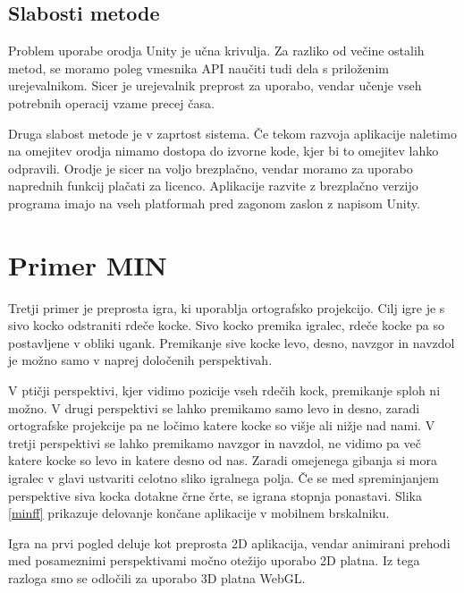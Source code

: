 \subsection{Slabosti metode}

Problem uporabe orodja Unity je učna krivulja. Za razliko od večine ostalih metod, se moramo poleg vmesnika API naučiti tudi dela s priloženim urejevalnikom. Sicer je urejevalnik preprost za uporabo, vendar učenje vseh potrebnih operacij vzame precej časa.

Druga slabost metode je v zaprtost sistema. Če tekom razvoja aplikacije naletimo na omejitev orodja nimamo dostopa do izvorne kode, kjer bi to omejitev lahko odpravili. Orodje je sicer na voljo brezplačno, vendar moramo za uporabo naprednih funkcij plačati za licenco. Aplikacije razvite z brezplačno verzijo programa imajo na vseh platformah pred zagonom zaslon z napisom Unity. 

\section{Primer MIN}

Tretji primer je preprosta igra, ki uporablja ortografsko projekcijo. Cilj igre je s sivo kocko odstraniti rdeče kocke. Sivo kocko premika igralec, rdeče kocke pa so postavljene v obliki ugank. Premikanje sive kocke levo, desno, navzgor in navzdol je možno samo v naprej določenih perspektivah. 

V ptičji perspektivi, kjer vidimo pozicije vseh rdečih kock, premikanje sploh ni možno. V drugi perspektivi se lahko premikamo samo levo in desno, zaradi ortografske projekcije pa ne ločimo katere kocke so višje ali nižje nad nami. V tretji perspektivi se lahko premikamo navzgor in navzdol, ne vidimo pa več katere kocke so levo in katere desno od nas. Zaradi omejenega gibanja si mora igralec v glavi ustvariti celotno sliko igralnega polja. Če se med spreminjanjem perspektive siva kocka dotakne črne črte, se igrana stopnja ponastavi. Slika \ref{minff} prikazuje delovanje končane aplikacije v mobilnem brskalniku.

Igra na prvi pogled deluje kot preprosta 2D aplikacija, vendar animirani prehodi med posameznimi perspektivami močno otežijo uporabo 2D platna. Iz tega razloga smo se odločili za uporabo 3D platna WebGL. %

